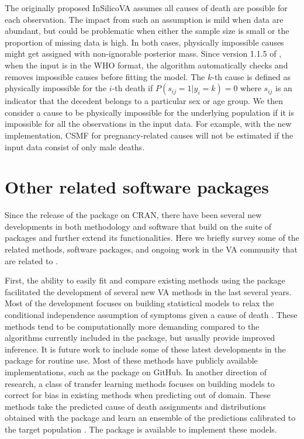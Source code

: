 The originally proposed InSilicoVA assumes all causes of death are
possible for each observation. The impact from such an assumption is
mild when data are abundant, but could be problematic when either the
sample size is small or the proportion of missing data is high. In both
cases, physically impossible causes might get assigned with
non-ignorable posterior mass. Since version 1.1.5 of
, when the input is in the WHO format, the algorithm
automatically checks and removes impossible causes before fitting the
model. The \(k\)-th cause is defined as physically impossible for the
\(i\)-th death if \(P(s_{ij}=1 | y_{i}=k) = 0\) where \(s_{ij}\) is an
indicator that the decedent belongs to a particular sex or age group. We
then consider a cause to be physically impossible for the underlying
population if it is impossible for all the observations in the input
data. For example, with the new implementation, CSMF for
pregnancy-related causes will not be estimated if the input data consist
of only male deaths.

\hypertarget{other-related-software-packages}{%
\section{Other related software
packages}\label{other-related-software-packages}}

\label{sec:other} Since the release of the  package on
CRAN, there have been several new developments in both methodology and
software that build on the  suite of packages and
further extend its functionalities. Here we briefly survey some of the
related methods, software packages, and ongoing work in the VA community
that are related to .

First, the ability to easily fit and compare existing methods using the
 package facilitated the development of several new VA
methods in the last several years. Most of the development focuses on
building statistical models to relax the conditional independence
assumption of symptoms given a cause of death
\citep[e.g.,][]{li2017mix, tsuyoshi2017, moran2021bayesian, li2021bayesian, wu2021double}.
These methods tend to be computationally more demanding compared to the
algorithms currently included in the  package, but
usually provide improved inference. It is future work to include some of
these latest developments in the  package for routine
use. Most of these methods have publicly available implementations, such
as the  package \citep{farva} on GitHub. In another direction
of research, a class of transfer learning methods focuses on building
models to correct for bias in existing methods when predicting out of
domain. These methods take the predicted cause of death assignments and
distributions obtained with the  package and learn an
ensemble of the predictions calibrated to the target population
\citep{caliva, fiksel2020generalized}. The  package
\citep{calibratedVA} is available to implement these models.

